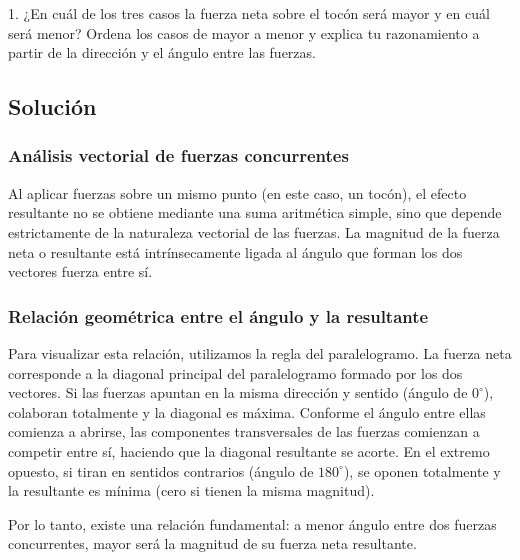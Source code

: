 \documentclass[12pt, a4paper]{article}
\begin{document}
1. ¿En cuál de los tres casos la fuerza neta sobre el tocón será mayor y en cuál será menor? Ordena los casos de mayor a menor y explica tu razonamiento a partir de la dirección y el ángulo entre las fuerzas.

\subsection*{Solución}

\subsubsection*{Análisis vectorial de fuerzas concurrentes}
Al aplicar fuerzas sobre un mismo punto (en este caso, un tocón), el efecto resultante no se obtiene mediante una suma aritmética simple, sino que depende estrictamente de la naturaleza vectorial de las fuerzas. La magnitud de la fuerza neta o resultante está intrínsecamente ligada al ángulo que forman los dos vectores fuerza entre sí. 

\subsubsection*{Relación geométrica entre el ángulo y la resultante}
Para visualizar esta relación, utilizamos la regla del paralelogramo. La fuerza neta corresponde a la diagonal principal del paralelogramo formado por los dos vectores. 
Si las fuerzas apuntan en la misma dirección y sentido (ángulo de $0^\circ$), colaboran totalmente y la diagonal es máxima. Conforme el ángulo entre ellas comienza a abrirse, las componentes transversales de las fuerzas comienzan a competir entre sí, haciendo que la diagonal resultante se acorte. En el extremo opuesto, si tiran en sentidos contrarios (ángulo de $180^\circ$), se oponen totalmente y la resultante es mínima (cero si tienen la misma magnitud). 

Por lo tanto, existe una relación fundamental: a menor ángulo entre dos fuerzas concurrentes, mayor será la magnitud de su fuerza neta resultante.
\end{document}
